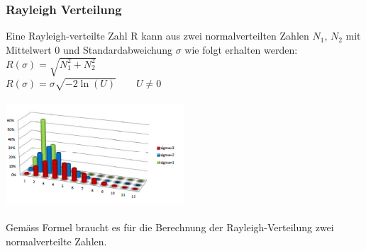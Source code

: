 \subsubsection{Rayleigh Verteilung}
Eine Rayleigh-verteilte Zahl R kann aus zwei normalverteilten Zahlen $N_1$, $N_2$ mit Mittelwert 0 und Standardabweichung $\sigma$ wie folgt erhalten werden:\\
$R(\sigma) = \sqrt{N_1^2 + N_2^2}$\\
$R(\sigma) = \sigma \sqrt{-2 \ln(U)} \qquad U \neq 0$\\\\
\includegraphics[width=0.5\textwidth]{images/Simulation/Rayleighverteilung.png}\\\\
Gemäss Formel braucht es für die Berechnung der Rayleigh-Verteilung zwei normalverteilte Zahlen.


